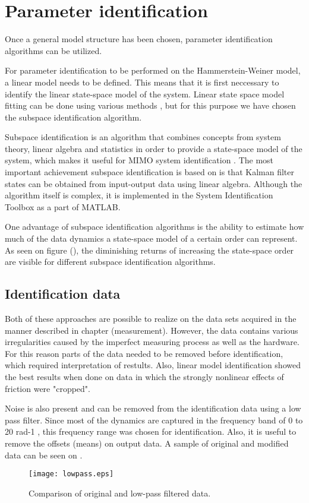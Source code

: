 \section{Parameter identification}
Once a general model structure has been chosen, parameter identification algorithms can be utilized.

For parameter identification to be performed on the Hammerstein-Weiner model, a linear model needs to be defined.
This means that it is first neccessary to identify the linear state-space model of the system.
Linear state space model fitting can be done using various methods , but for this purpose we have chosen the subspace identification algorithm.

Subspace identification is an algorithm that combines concepts from system theory, linear algebra and statistics in order to provide a state-space model of the system, which makes it useful for MIMO system identification \cite{van2012subspace}. 
The most important achievement subspace identification is based on is that Kalman filter states can be obtained from input-output data using linear algebra.
Although the algorithm itself is complex, it is implemented in the System Identification Toolbox as a part of MATLAB.

One advantage of subspace identification algorithms is the ability to estimate how much of the data dynamics a state-space model of a certain order can represent. 
As seen on figure (), the diminishing returns of increasing the state-space order are visible for different subspace identification algorithms.


\subsection{Identification data}
Both of these approaches are possible to realize on the data sets acquired in the manner described in chapter (measurement).
However, the data contains various irregularities caused by the imperfect measuring process as well as the hardware.
For this reason parts of the data needed to be removed before identification, which required interpretation of restults.
Also, linear model identification showed the best results when done on data in which the strongly nonlinear effects of friction were "cropped".


Noise is also present and can be removed from the identification data using a low pass filter.
Since most of the dynamics are captured in the frequency band of 0 to 20 rad-1 , this frequency range was chosen for identification.
Also, it is useful to remove the offsets (means) on output data.
A sample of original and modified data can be seen on .
%
\begin{figure}[H]
\centering
\texttt{[image: lowpass.eps]}
\caption{Comparison of original and low-pass filtered data.}
\label{figlowpass}
\end{figure}

